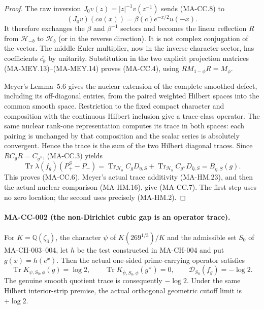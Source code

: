 \begin{proof}
The raw inversion $J_0v(z)=|z|^{-1}v(z^{-1})$ sends
(MA-CC.8) to
\[
 (J_0v)(ca(x))=\beta(c)e^{-x/2}u(-x).
\tag{MA-CC.9}
\]
It therefore exchanges the $\beta$ and $\beta^{-1}$ sectors and
becomes the linear reflection $R$ from $\mathcal H_{-b}$ to
$\mathcal H_b$ (or in the reverse direction).  It is not complex
conjugation of the vector.  The middle Euler multiplier, now in
the inverse character sector, has coefficients
$\overline{c_{\mathfrak p}}$ by unitarity.  Substitution in the
two explicit projection matrices (MA-MEY.13)--(MA-MEY.14)
proves (MA-CC.4), using $RM_{1-\phi}R=M_\phi$.

Meyer's Lemma~5.6 gives the nuclear extension of the complete
smoothed defect, including its off-diagonal entries, from the
paired weighted Hilbert spaces into the common smooth space.
Restriction to the fixed compact character and composition with
the continuous Hilbert inclusion give a trace-class operator.
The same nuclear rank-one representation computes its trace in
both spaces: each pairing is unchanged by that composition and
the scalar series is absolutely convergent.  Hence the trace is
the sum of the two Hilbert diagonal traces.  Since
$RC_gR=C_{g^\vee}$, (MA-CC.3) yields
\[
 \operatorname{Tr}\lambda(f_g)(P_+^S-P_-)
 =\operatorname{Tr}_{\mathcal H_b}C_gD_{\eta,S}
  +\operatorname{Tr}_{\mathcal H_b}C_{g^\vee}D_{\bar\eta,S}
 =B_{\eta,\overline S}(g).
\]
This proves (MA-CC.6).  Meyer's actual trace additivity
(MA-HM.23), and then the actual nuclear comparison (MA-HM.16),
give (MA-CC.7).  The first step uses no zero location; the
second uses precisely (MA-HM.2).
\end{proof}

\paragraph{MA-CC-002 (the non-Dirichlet cubic gap is an operator trace).}
For $K=\mathbb Q(\zeta_3)$, the character $\psi$ of
$K(269^{1/3})/K$ and the admissible set $S_0$ of MA-CH-003--004,
let $h$ be the test constructed in MA-CH-004 and put
$g(x)=h(e^x)$.  Then the actual one-sided prime-carrying operator
satisfies
\[
 \operatorname{Tr}K_{\psi,S_0,\phi}(g)=\log2,
 \qquad
 \operatorname{Tr}K_{\bar\psi,S_0,\phi}(g^\vee)=0,
 \qquad \mathcal D_{S_0}(f_g)=-\log2.
\tag{MA-CC.10}
\]
The genuine smooth quotient trace is consequently $-\log2$.
Under the same Hilbert interior-strip premise, the actual
orthogonal geometric cutoff limit is $+\log2$.

